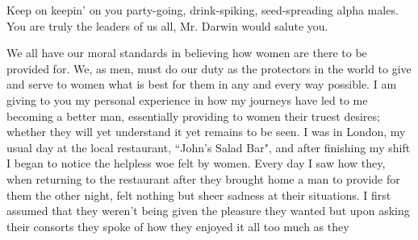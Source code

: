 Keep on keepin' on you party-going, drink-spiking, seed-spreading alpha males. 
You are truly the leaders of us all, Mr. Darwin would salute you.



We all have our moral standards in believing how women are there to be provided 
for. We, as men, must do our duty as the protectors in the world to give and 
serve to women what is best for them in any and every way possible. I am giving 
to you my personal experience in how my journeys have led to me becoming a 
better man, essentially providing to women their truest desires; whether they 
will yet understand it yet remains to be seen. I was in London, my usual day at 
the local restaurant, “John’s Salad Bar", and after finishing my shift I began 
to notice the helpless woe felt by women. Every day I saw how they, when 
returning to the restaurant after they brought home a man to provide for them 
the other night, felt nothing but sheer sadness at their situations. I first 
assumed that they weren't being given the pleasure they wanted but upon asking 
their consorts they spoke of how they enjoyed it all too much as they


